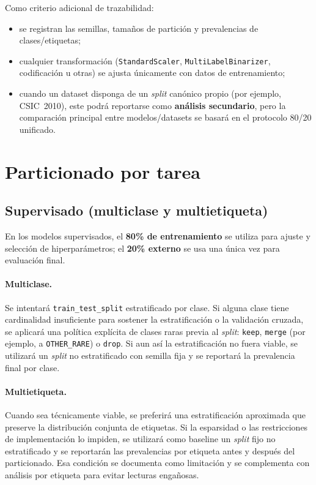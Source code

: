 \documentclass[12pt,oneside]{report}
\begin{document}
Como criterio adicional de trazabilidad:
\begin{itemize}[leftmargin=*]
  \item se registran las semillas, tamaños de partición y prevalencias de clases/etiquetas;
  \item cualquier transformación (\texttt{StandardScaler}, \texttt{MultiLabelBinarizer}, codificación u otras) se ajusta únicamente con datos de entrenamiento;
  \item cuando un dataset disponga de un \textit{split} canónico propio (por ejemplo, CSIC~2010), este podrá reportarse como \textbf{análisis secundario}, pero la comparación principal entre modelos/datasets se basará en el protocolo 80/20 unificado.
\end{itemize}

\section{Particionado por tarea}
\subsection{Supervisado (multiclase y multietiqueta)}
En los modelos supervisados, el \textbf{80\% de entrenamiento} se utiliza para ajuste y selección de hiperparámetros; el \textbf{20\% externo} se usa una única vez para evaluación final.

\paragraph{Multiclase.}
Se intentará \texttt{train\_test\_split} estratificado por clase. Si alguna clase tiene cardinalidad insuficiente para sostener la estratificación o la validación cruzada, se aplicará una política explícita de clases raras previa al \textit{split}: \texttt{keep}, \texttt{merge} (por ejemplo, a \texttt{OTHER\_RARE}) o \texttt{drop}. Si aun así la estratificación no fuera viable, se utilizará un \textit{split} no estratificado con semilla fija y se reportará la prevalencia final por clase.

\paragraph{Multietiqueta.}
Cuando sea técnicamente viable, se preferirá una estratificación aproximada que preserve la distribución conjunta de etiquetas. Si la esparsidad o las restricciones de implementación lo impiden, se utilizará como baseline un \textit{split} fijo no estratificado y se reportarán las prevalencias por etiqueta antes y después del particionado. Esa condición se documenta como limitación y se complementa con análisis por etiqueta para evitar lecturas engañosas.
\end{document}
